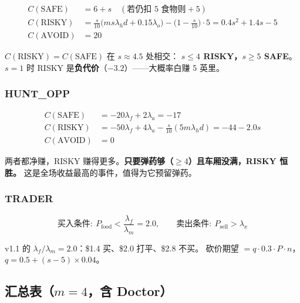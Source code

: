 \documentclass[UTF8,11pt,a4paper]{ctexart}
\begin{document}
\begin{align*}
C(\text{SAFE})&=6+s\quad(\text{若仍扣 5 食物则}+5)\\
C(\text{RISKY})&=\tfrac{s}{10}\big(m s\lambda_h d+0.15\lambda_o\big)-\big(1-\tfrac{s}{10}\big)\cdot5
=0.4s^2+1.4s-5\\
C(\text{AVOID})&=20
\end{align*}

$C(\text{RISKY})=C(\text{SAFE})$ 在 $s\approx4.5$ 处相交：
\textbf{$s\le4$ RISKY，$s\ge5$ SAFE}。
$s=1$ 时 RISKY 是\textbf{负代价}（$-3.2$）——大概率白赚 5 英里。

\subsubsection*{HUNT\_OPP}

\begin{align*}
C(\text{SAFE})&=-20\lambda_f+2\lambda_a=-17\\
C(\text{RISKY})&=-50\lambda_f+4\lambda_a-\tfrac{s}{10}(5m\lambda_h d)=-44-2.0s\\
C(\text{AVOID})&=0
\end{align*}

两者都净赚，RISKY 赚得更多。\textbf{只要弹药够（$\ge4$）且车厢没满，RISKY 恒胜。}
这是全场收益最高的事件，值得为它预留弹药。

\subsubsection*{TRADER}

\[
\text{买入条件}:\ P_{\text{food}}<\frac{\lambda_f}{\lambda_m}=2.0,\qquad
\text{卖出条件}:\ P_{\text{sell}}>\lambda_x
\]

v1.1 的 $\lambda_f/\lambda_m=2.0$：\$1.4 买、\$2.0 打平、\$2.8 不买。
砍价期望 $=q\cdot0.3\cdot P\cdot n$，$q=0.5+(s-5)\times0.04$。

\subsection{汇总表（$m=4$，含 Doctor）}
\end{document}
